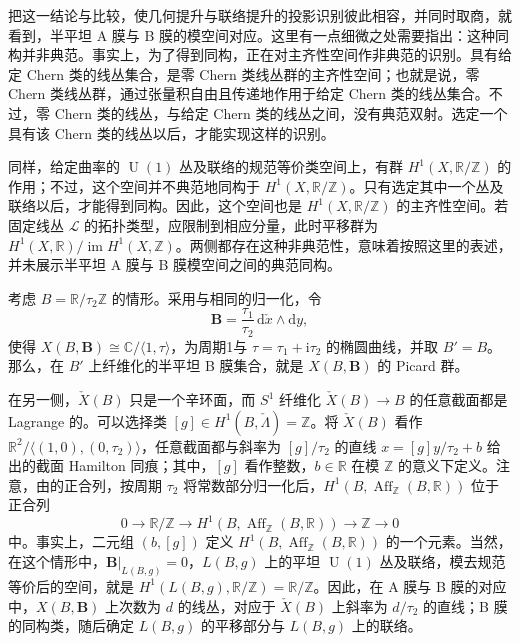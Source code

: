把这一结论与比较，使几何提升与联络提升的投影识别彼此相容，并同时取商，就看到，半平坦 A 膜与 B 膜的模空间对应。这里有一点细微之处需要指出：这种同构并非典范。事实上，为了得到同构，正在对主齐性空间作非典范的识别。具有给定 Chern 类的线丛集合，是零 Chern 类线丛群的主齐性空间；也就是说，零 Chern 类线丛群，通过张量积自由且传递地作用于给定 Chern 类的线丛集合。不过，零 Chern 类的线丛，与给定 Chern 类的线丛之间，没有典范双射。选定一个具有该 Chern 类的线丛以后，才能实现这样的识别。

同样，给定曲率的 $\operatorname{U}(1)$ 丛及联络的规范等价类空间上，有群 $H^1(X,\mathbb R/\mathbb Z)$ 的作用；不过，这个空间并不典范地同构于 $H^1(X,\mathbb R/\mathbb Z)$。只有选定其中一个丛及联络以后，才能得到同构。因此，这个空间也是 $H^1(X,\mathbb R/\mathbb Z)$ 的主齐性空间。若固定线丛 $\mathcal L$ 的拓扑类型，应限制到相应分量，此时平移群为 $H^1(X,\mathbb R)/\operatorname{im}H^1(X,\mathbb Z)$。两侧都存在这种非典范性，意味着按照这里的表述，并未展示半平坦 A 膜与 B 膜模空间之间的典范同构。

\begin{example}\label{ex:6.73}
考虑 $B=\mathbb R/\tau_2\mathbb Z$ 的情形。采用与相同的归一化，令
\[
\mathbf B=\frac{\tau_1}{\tau_2}\,\mathrm d\check x\wedge\mathrm dy,
\]
使得 $X(B,\mathbf B)\cong\mathbb C/\langle1,\tau\rangle$，为周期1与 $\tau=\tau_1+\mathrm i\tau_2$ 的椭圆曲线，并取 $B'=B$。那么，在 $B'$ 上纤维化的半平坦 B 膜集合，就是 $X(B,\mathbf B)$ 的 Picard 群。

在另一侧，$\check X(B)$ 只是一个辛环面，而 $S^1$ 纤维化 $\check X(B)\to B$ 的任意截面都是 Lagrange 的。可以选择类 $[g]\in H^1(B,\check\Lambda)=\mathbb Z$。将 $\check X(B)$ 看作 $\mathbb R^2/\langle(1,0),(0,\tau_2)\rangle$，任意截面都与斜率为 $[g]/\tau_2$ 的直线 $x=[g]y/\tau_2+b$ 给出的截面 Hamilton 同痕；其中，$[g]$ 看作整数，$b\in\mathbb R$ 在模 $\mathbb Z$ 的意义下定义。注意，由的正合列，按周期 $\tau_2$ 将常数部分归一化后，$H^1(B,\operatorname{Aff}_{\mathbb Z}(B,\mathbb R))$ 位于正合列
\[
0\longrightarrow\mathbb R/\mathbb Z
\longrightarrow H^1(B,\operatorname{Aff}_{\mathbb Z}(B,\mathbb R))
\longrightarrow\mathbb Z\longrightarrow0
\]
中。事实上，二元组 $(b,[g])$ 定义 $H^1(B,\operatorname{Aff}_{\mathbb Z}(B,\mathbb R))$ 的一个元素。当然，在这个情形中，$\mathbf B|_{L(B,g)}=0$，$L(B,g)$ 上的平坦 $\operatorname{U}(1)$ 丛及联络，模去规范等价后的空间，就是 $H^1(L(B,g),\mathbb R/\mathbb Z)=\mathbb R/\mathbb Z$。因此，在 A 膜与 B 膜的对应中，$X(B,\mathbf B)$ 上次数为 $d$ 的线丛，对应于 $\check X(B)$ 上斜率为 $d/\tau_2$ 的直线；B 膜的同构类，随后确定 $L(B,g)$ 的平移部分与 $L(B,g)$ 上的联络。
\end{example}

